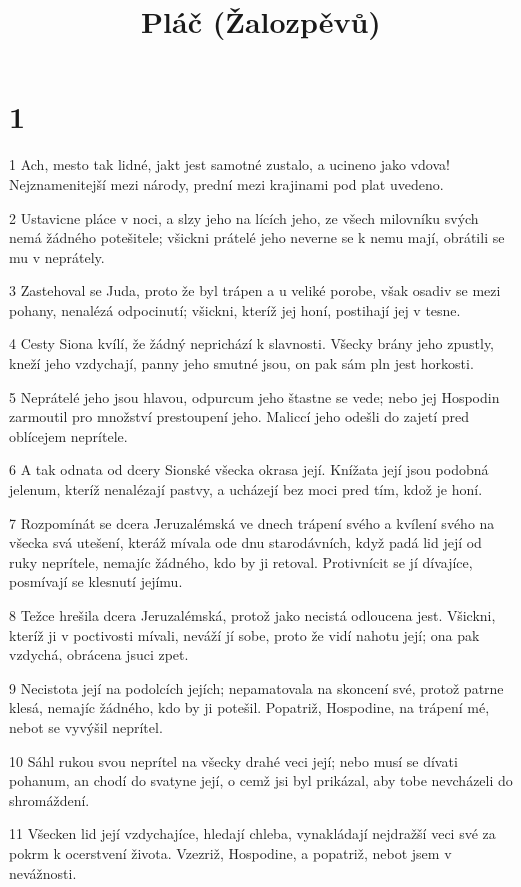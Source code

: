

\title{Pláč (Žalozpěvů)}

\chapter{1}

\par 1 Ach, mesto tak lidné, jakt jest samotné zustalo, a ucineno jako vdova! Nejznamenitejší mezi národy, prední mezi krajinami pod plat uvedeno.
\par 2 Ustavicne pláce v noci, a slzy jeho na lících jeho, ze všech milovníku svých nemá žádného potešitele; všickni prátelé jeho neverne se k nemu mají, obrátili se mu v neprátely.
\par 3 Zastehoval se Juda, proto že byl trápen a u veliké porobe, však osadiv se mezi pohany, nenalézá odpocinutí; všickni, kteríž jej honí, postihají jej v tesne.
\par 4 Cesty Siona kvílí, že žádný neprichází k slavnosti. Všecky brány jeho zpustly, kneží jeho vzdychají, panny jeho smutné jsou, on pak sám pln jest horkosti.
\par 5 Neprátelé jeho jsou hlavou, odpurcum jeho štastne se vede; nebo jej Hospodin zarmoutil pro množství prestoupení jeho. Maliccí jeho odešli do zajetí pred oblícejem neprítele.
\par 6 A tak odnata od dcery Sionské všecka okrasa její. Knížata její jsou podobná jelenum, kteríž nenalézají pastvy, a ucházejí bez moci pred tím, kdož je honí.
\par 7 Rozpomínát se dcera Jeruzalémská ve dnech trápení svého a kvílení svého na všecka svá utešení, kteráž mívala ode dnu starodávních, když padá lid její od ruky neprítele, nemajíc žádného, kdo by ji retoval. Protivnícit se jí dívajíce, posmívají se klesnutí jejímu.
\par 8 Težce hrešila dcera Jeruzalémská, protož jako necistá odloucena jest. Všickni, kteríž ji v poctivosti mívali, neváží jí sobe, proto že vidí nahotu její; ona pak vzdychá, obrácena jsuci zpet.
\par 9 Necistota její na podolcích jejích; nepamatovala na skoncení své, protož patrne klesá, nemajíc žádného, kdo by ji potešil. Popatriž, Hospodine, na trápení mé, nebot se vyvýšil neprítel.
\par 10 Sáhl rukou svou neprítel na všecky drahé veci její; nebo musí se dívati pohanum, an chodí do svatyne její, o cemž jsi byl prikázal, aby tobe nevcházeli do shromáždení.
\par 11 Všecken lid její vzdychajíce, hledají chleba, vynakládají nejdražší veci své za pokrm k ocerstvení života. Vzezriž, Hospodine, a popatriž, nebot jsem v nevážnosti.
